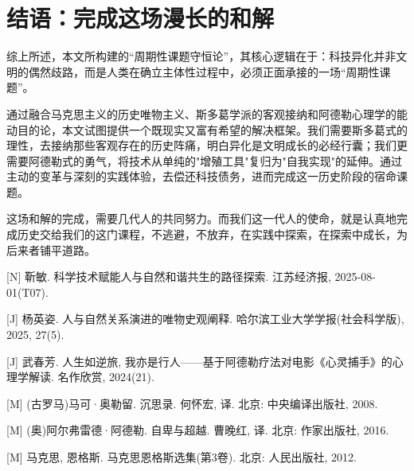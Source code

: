 \documentclass[a4paper,12pt]{ctexart}
\begin{document}
\section{结语：完成这场漫长的和解}

综上所述，本文所构建的“周期性课题守恒论”，其核心逻辑在于：科技异化并非文明的偶然歧路，而是人类在确立主体性过程中，必须正面承接的一场“周期性课题”。

通过融合马克思主义的历史唯物主义、斯多葛学派的客观接纳和阿德勒心理学的能动目的论，本文试图提供一个既现实又富有希望的解决框架。我们需要斯多葛式的理性，去接纳那些客观存在的历史阵痛，明白异化是文明成长的必经行囊；我们更需要阿德勒式的勇气，将技术从单纯的"增殖工具"复归为"自我实现"的延伸。通过主动的变革与深刻的实践体验，去偿还科技债务，进而完成这一历史阶段的宿命课题。

这场和解的完成，需要几代人的共同努力。而我们这一代人的使命，就是认真地完成历史交给我们的这门课程，不逃避，不放弃，在实践中探索，在探索中成长，为后来者铺平道路。

\newpage
\begin{PaperBib}
    \item {[N]} 靳敏. 科学技术赋能人与自然和谐共生的路径探索. 江苏经济报, 2025-08-01(T07).
    \item {[J]} 杨英姿. 人与自然关系演进的唯物史观阐释. 哈尔滨工业大学学报(社会科学版), 2025, 27(5).
    \item {[J]} 武春芳. 人生如逆旅, 我亦是行人——基于阿德勒疗法对电影《心灵捕手》的心理学解读. 名作欣赏, 2024(21).
    \item {[M]} (古罗马)马可·奥勒留. 沉思录. 何怀宏, 译. 北京: 中央编译出版社, 2008.
    \item {[M]} (奥)阿尔弗雷德·阿德勒. 自卑与超越. 曹晚红, 译. 北京: 作家出版社, 2016.
    \item {[M]} 马克思, 恩格斯. 马克思恩格斯选集(第3卷). 北京: 人民出版社, 2012.
\end{PaperBib}

\makeBio
\end{document}
